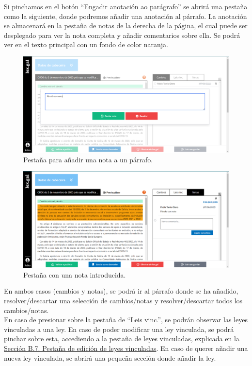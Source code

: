 Si pinchamos en el botón ``Engadir anotación ao parágrafo'' se abrirá una pestaña como la siguiente, donde podremos añadir una anotación al párrafo. La anotación se almacenará en la pestaña de notas de la derecha de la página, el cual puede ser desplegado para ver la nota completa y añadir comentarios sobre ella. Se podrá ver en el texto principal con un fondo de color naranja.

\begin{figure}[H]
\centerline{\includegraphics[width=15cm]{figuras/manualUsuario/Notas.PNG}}
\caption{Pestaña para añadir una nota a un párrafo.}
\label{enlaceNotas}
\end{figure}

\begin{figure}[H]
\centerline{\includegraphics[width=15cm]{figuras/manualUsuario/PestanaNotas.PNG}}
\caption{Pestaña con una nota introducida.}
\label{enlacePestanaNotas}
\end{figure}

En ambos casos (cambios y notas), se podrá ir al párrafo donde se ha añadido, resolver/descartar una selección de cambios/notas y resolver/descartar todos los cambios/notas.
\\

En caso de presionar sobre la pestaña de ``Leis vinc.'', se podrán observar las leyes vinculadas a una ley. En caso de poder modificar una ley vinculada, se podrá pinchar sobre esta, accediendo a la pestaña de leyes vinculadas, explicada en la \hyperref[PPrevisualizacionLexGal]{Sección B.7. Pestaña de edición de leyes vinculadas}. En caso de querer añadir una nueva ley vinculada, se abrirá una pequeña sección donde añadir la ley.


